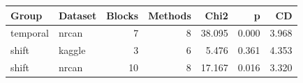 \begin{tabular}{llrrrrr}
\toprule
Group & Dataset & Blocks & Methods & Chi2 & p & CD \\
\midrule
temporal & nrcan & 7 & 8 & 38.095 & 0.000 & 3.968 \\
shift & kaggle & 3 & 6 & 5.476 & 0.361 & 4.353 \\
shift & nrcan & 10 & 8 & 17.167 & 0.016 & 3.320 \\
\bottomrule
\end{tabular}
